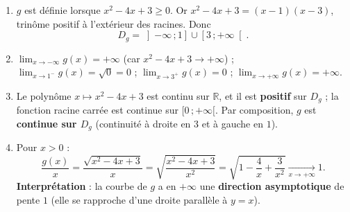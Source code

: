 \documentclass[11pt]{article}
\begin{document}
\begin{corrige}
\begin{enumerate}
\item $g$ est définie lorsque $x^2-4x+3\geq 0$. Or $x^2-4x+3=(x-1)(x-3)$, trinôme positif à l'extérieur des racines. Donc
\[D_g=\left]-\infty\,;1\right]\cup\left[3\,;+\infty\right[.\]
\item $\displaystyle\lim_{x\to-\infty}g(x)=+\infty$ (car $x^2-4x+3\to+\infty$) ; $\displaystyle\lim_{x\to 1^-}g(x)=\sqrt{0}=0$ ; $\displaystyle\lim_{x\to 3^+}g(x)=0$ ; $\displaystyle\lim_{x\to+\infty}g(x)=+\infty$.
\item Le polynôme $x\mapsto x^2-4x+3$ est continu sur $\mathbb{R}$, et il est \textbf{positif} sur $D_g$ ; la fonction racine carrée est continue sur $[0\,;+\infty[$. Par composition, $g$ est \textbf{continue sur $D_g$} (continuité à droite en $3$ et à gauche en $1$).
\item Pour $x>0$ :
\[\dfrac{g(x)}{x}=\dfrac{\sqrt{x^2-4x+3}}{x}=\sqrt{\dfrac{x^2-4x+3}{x^2}}=\sqrt{1-\dfrac{4}{x}+\dfrac{3}{x^2}}\xrightarrow[x\to+\infty]{}1.\]
\textbf{Interprétation} : la courbe de $g$ a en $+\infty$ une \textbf{direction asymptotique} de pente $1$ (elle se rapproche d'une droite parallèle à $y=x$).
\end{enumerate}
\end{corrige}
\end{document}
